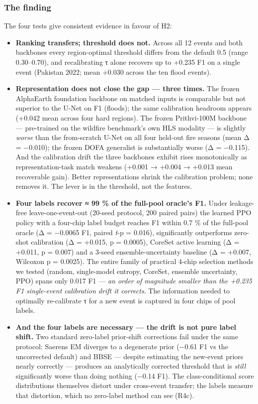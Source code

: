 \subsubsection{The finding}\label{the-finding}

The four tests give consistent evidence in favour of H2:

\begin{itemize}
\tightlist
\item
  \textbf{Ranking transfers; threshold does not.} Across all 12 events and
  both backbones every region-optimal threshold differs from the default
  0.5 (range 0.30--0.70), and recalibrating τ alone recovers up to +0.235
  F1 on a single event (Pakistan 2022; mean +0.030 across the ten flood
  events).
\item
  \textbf{Representation does not close the gap --- three times.} The frozen
  AlphaEarth foundation backbone on matched inputs is comparable but
  not superior to the U-Net on F1 (floods); the same calibration
  headroom appears (+0.042 mean across four hard regions). The frozen
  Prithvi-100M backbone --- pre-trained on the wildfire benchmark's own
  HLS modality --- is slightly \emph{worse} than the from-scratch U-Net on
  all four held-out fire seasons (mean Δ = −0.010); the frozen DOFA
  generalist is substantially worse (Δ = −0.115). And the calibration
  drift the three backbones exhibit rises monotonically as
  representation-task match weakens (+0.001 → +0.004 → +0.013 mean
  recoverable gain). Better representations shrink the calibration
  problem; none removes it. The lever is in the threshold, not the
  features.
\item
  \textbf{Four labels recover ≈ 99 \% of the full-pool oracle's F1.} Under
  leakage-free leave-one-event-out (20-seed protocol, 200 paired pairs)
  the learned PPO policy with a four-chip label budget reaches F1 within
  0.7 \% of the full-pool oracle (Δ = −0.0065 F1, paired \emph{t}-p = 0.016),
  significantly outperforms zero-shot calibration (Δ = +0.015, p =
  0.0005), CoreSet active learning (Δ = +0.011, p = 0.007) and a
  3-seed ensemble-uncertainty baseline (Δ = +0.007, Wilcoxon p =
  0.0025). The entire family of practical 4-chip selection methods we
  tested (random, single-model entropy, CoreSet, ensemble uncertainty,
  PPO) spans only 0.017 F1 --- \emph{an order of magnitude smaller than the
  +0.235 F1 single-event calibration drift it corrects}. The
  information needed to optimally re-calibrate τ for a new event is
  captured in four chips of pool labels.
\item
  \textbf{And the four labels are necessary --- the drift is not pure label
  shift.} Two standard zero-label prior-shift corrections fail under
  the same protocol: Saerens EM diverges to a degenerate prior
  (−0.61 F1 vs the uncorrected default) and BBSE --- despite estimating
  the new-event priors nearly correctly --- produces an analytically
  corrected threshold that is \emph{still} significantly worse than doing
  nothing (−0.14 F1). The class-conditional score distributions
  themselves distort under cross-event transfer; the labels measure
  that distortion, which no zero-label method can see (R4c).
\end{itemize}

